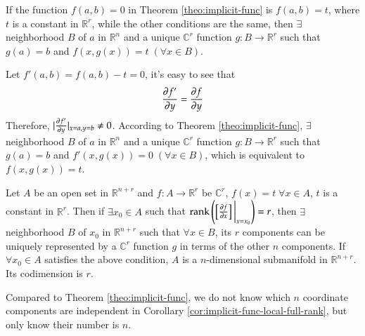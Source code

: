 \documentclass[11pt, a4paper]{book}
\begin{document}
\begin{Corollary}
  If the function $f(a, b) = 0$ in Theorem \ref{theo:implicit-func} is $f(a, b) = t$,
  where $t$ is a constant in $\mathbb{R}^r$, while the other conditions are the same, then
  $\exists$ neighborhood $B$ of $a$ in $\mathbb{R}^n$ and a unique $\mathbb{C}^r$ function
  $g: B \rightarrow \mathbb{R}^r$ such that $g(a) = b$ and
  $f(x, g(x)) = t \; (\forall x \in B)$.
\end{Corollary}

\begin{Proof}
  Let $f'(a, b) = f(a, b) - t = 0$, it's easy to see that
  $$
  \frac{\partial f'}{\partial y} = \frac{\partial f}{\partial y}
  $$
  Therefore, $\lvert\frac{\partial f'}{\partial y}\rvert_{x=a, y=b} \neq 0$. According to Theorem
  \ref{theo:implicit-func}, $\exists$ neighborhood $B$ of $a$ in $\mathbb{R}^n$ and a
  unique $\mathbb{C}^r$ function $g: B \rightarrow \mathbb{R}^r$ such that $g(a) = b$ and
  $f'(x, g(x)) = 0 \; (\forall x \in B)$, which is equivalent to $f(x, g(x)) = t$.
\end{Proof}

\begin{Corollary}
  \label{cor:implicit-func-local-full-rank}
  Let $A$ be an open set in $\mathbb{R}^{n+r}$ and $f: A \rightarrow \mathbb{R}^r$ be
  $\mathbb{C}^r$, $f(x) = t \; \forall x \in A$, $t$ is a constant in $\mathbb{R}^r$. Then
  if $\exists x_0 \in A$ such that
  $\operatorname{rank}\left( \left[ \frac{\partial f}{\partial x} \right] \bigg\vert_{x=x_0} \right)=r$,
  then $\exists$ neighborhood $B$ of $x_0$ in $\mathbb{R}^{n+r}$ such that
  $\forall x \in B$, its $r$ components can be uniquely represented by a $\mathbb{C}^r$
  function $g$ in terms of the other $n$ components. If $\forall x_0 \in A$ satisfies the
  above condition, $A$ is a $n$-dimensional submanifold in $\mathbb{R}^{n+r}$. Its
  codimension is $r$.
\end{Corollary}

\begin{Remark}
  Compared to Theorem \ref{theo:implicit-func}, we do not know which $n$ coordinate
  components are independent in Corollary \ref{cor:implicit-func-local-full-rank}, but
  only know their number is $n$.
\end{Remark}
\end{document}
